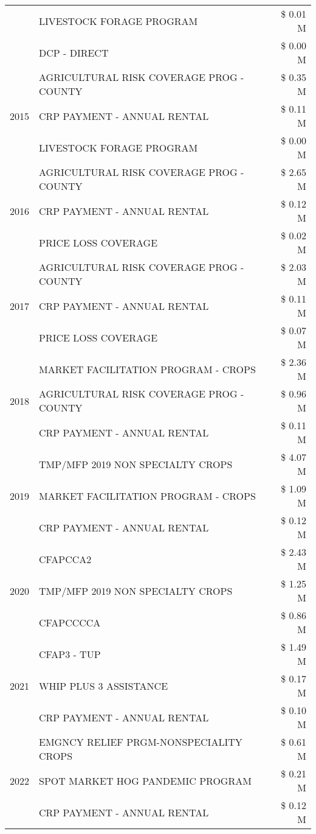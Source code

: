\begin{tabular}{llr}
 & LIVESTOCK FORAGE PROGRAM & \$ 0.01 M \\
 & DCP - DIRECT & \$ 0.00 M \\
\cline{1-3}
\multirow[t]{3}{*}{2015} & AGRICULTURAL RISK COVERAGE PROG - COUNTY & \$ 0.35 M \\
 & CRP PAYMENT - ANNUAL RENTAL & \$ 0.11 M \\
 & LIVESTOCK FORAGE PROGRAM & \$ 0.00 M \\
\cline{1-3}
\multirow[t]{3}{*}{2016} & AGRICULTURAL RISK COVERAGE PROG - COUNTY & \$ 2.65 M \\
 & CRP PAYMENT - ANNUAL RENTAL & \$ 0.12 M \\
 & PRICE LOSS COVERAGE & \$ 0.02 M \\
\cline{1-3}
\multirow[t]{3}{*}{2017} & AGRICULTURAL RISK COVERAGE PROG - COUNTY & \$ 2.03 M \\
 & CRP PAYMENT - ANNUAL RENTAL & \$ 0.11 M \\
 & PRICE LOSS COVERAGE & \$ 0.07 M \\
\cline{1-3}
\multirow[t]{3}{*}{2018} & MARKET FACILITATION PROGRAM - CROPS & \$ 2.36 M \\
 & AGRICULTURAL RISK COVERAGE PROG - COUNTY & \$ 0.96 M \\
 & CRP PAYMENT - ANNUAL RENTAL & \$ 0.11 M \\
\cline{1-3}
\multirow[t]{3}{*}{2019} & TMP/MFP 2019 NON SPECIALTY CROPS & \$ 4.07 M \\
 & MARKET FACILITATION PROGRAM - CROPS & \$ 1.09 M \\
 & CRP PAYMENT - ANNUAL RENTAL & \$ 0.12 M \\
\cline{1-3}
\multirow[t]{3}{*}{2020} & CFAPCCA2 & \$ 2.43 M \\
 & TMP/MFP 2019 NON SPECIALTY CROPS & \$ 1.25 M \\
 & CFAPCCCCA & \$ 0.86 M \\
\cline{1-3}
\multirow[t]{3}{*}{2021} & CFAP3 - TUP & \$ 1.49 M \\
 & WHIP PLUS 3 ASSISTANCE & \$ 0.17 M \\
 & CRP PAYMENT - ANNUAL RENTAL & \$ 0.10 M \\
\cline{1-3}
\multirow[t]{3}{*}{2022} & EMGNCY RELIEF PRGM-NONSPECIALITY CROPS & \$ 0.61 M \\
 & SPOT MARKET HOG PANDEMIC PROGRAM & \$ 0.21 M \\
 & CRP PAYMENT - ANNUAL RENTAL & \$ 0.12 M \\
\cline{1-3}
\bottomrule
\end{tabular}
